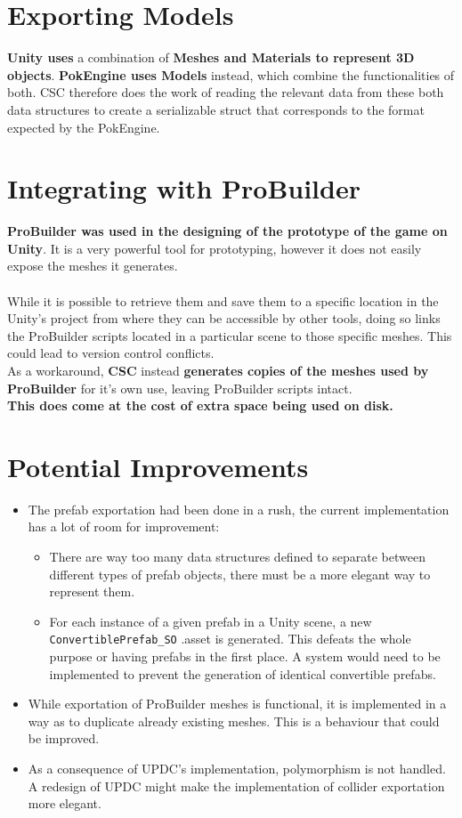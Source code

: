 \documentclass[12pt,a4paper]{article}
\begin{document}
\section{Exporting Models}
\textbf{Unity uses} a combination of \textbf{Meshes and Materials to represent 3D objects}. \textbf{PokEngine uses Models} instead, which combine the functionalities of both. CSC therefore does the work of reading the relevant data from these both data structures to create a serializable struct that corresponds to the format expected by the PokEngine.

\section{Integrating with ProBuilder}
\textbf{ProBuilder was used in the designing of the prototype of the game on Unity}. It is a very powerful tool for prototyping, however it does not easily expose the meshes it generates.\\\\
While it is possible to retrieve them and save them to a specific location in the Unity's project from where they can be accessible by other tools, doing so links the ProBuilder scripts located in a particular scene to those specific meshes. This could lead to version control conflicts.\\
As a workaround, \textbf{CSC} instead \textbf{generates copies of the meshes used by ProBuilder} for it's own use, leaving ProBuilder scripts intact.\\
\textbf{This does come at the cost of extra space being used on disk.}

\section{Potential Improvements}
\begin{itemize}
\item The prefab exportation had been done in a rush, the current implementation has a lot of room for improvement:
\begin{itemize}
\item There are way too many data structures defined to separate between different types of prefab objects, there must be a more elegant way to represent them.
\item For each instance of a given prefab in a Unity scene, a new \texttt{ConvertiblePrefab\_SO} .asset is generated. This defeats the whole purpose or having prefabs in the first place. A system would need to be implemented to prevent the generation of identical convertible prefabs.
\end{itemize}
\item While exportation of ProBuilder meshes is functional, it is implemented in a way as to duplicate already existing meshes. This is a behaviour that could be improved.
\item As a consequence of UPDC's implementation, polymorphism is not handled. A redesign of UPDC might make the implementation of collider exportation more elegant.
\end{itemize}
\end{document}
